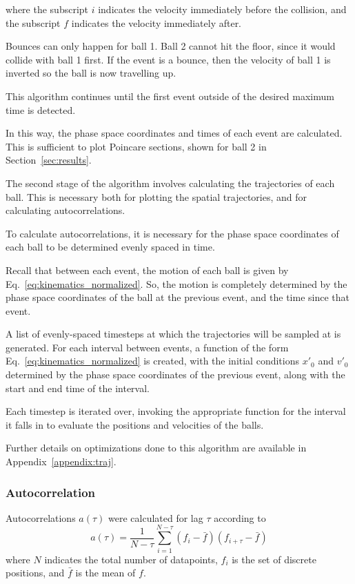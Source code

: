 \documentclass[pra,twocolumn,showpacs,amsmath,amssymb, aps, 10pt]{revtex4-1}
\begin{document}
where the subscript $i$ indicates the velocity immediately before the collision,
and the subscript $f$ indicates the velocity immediately after.

Bounces can only happen for ball 1. Ball 2 cannot hit the floor, since it would
collide with ball 1 first. If the event is a bounce, then the velocity of ball 1
is inverted so the ball is now travelling up. %

This algorithm continues until the first event outside of the desired maximum
time is detected.

In this way, the phase space coordinates and times of each event are calculated.
This is sufficient to plot Poincare sections, shown for ball 2 in
Section~\ref{sec:results}.

The second stage of the algorithm involves calculating the trajectories of each
ball. This is necessary both for plotting the spatial trajectories, and for
calculating autocorrelations.

To calculate autocorrelations, it is necessary %
for the phase space coordinates of each ball to be determined evenly spaced in time.

Recall that between each event, the motion of each ball is given by
Eq.~\ref{eq:kinematics_normalized}. So, the motion is completely determined by
the phase space coordinates of the ball at the previous event, and the time
since that event.

A list of evenly-spaced timesteps at which the trajectories will be sampled at
is generated. For each interval between events, a function of the form
Eq.~\ref{eq:kinematics_normalized} is created, with the initial conditions $x'_0$
and $v'_0$ determined by the phase space coordinates of the previous event, along
with the start and end time of the interval.

Each timestep is iterated over, invoking the appropriate function for the
interval it falls in to evaluate the positions and velocities of the balls.

Further details on optimizations done to this algorithm are available
in Appendix~\ref{appendix:traj}.


\subsubsection{Autocorrelation}

Autocorrelations $a(\tau)$ were calculated for lag $\tau$ according to
\begin{equation}
  a(\tau) = \frac{1}{N-\tau} \sum_{i=1}^{N-\tau}
  \left(f_i - \bar f \right)
  \left(f_{i+\tau} - \bar f \right)
  \label{eq:acorr}
\end{equation}
where $N$ indicates the total number of datapoints, $f_i$ is the set of discrete
positions, and $\bar f$ is the mean of $f$.
\end{document}
